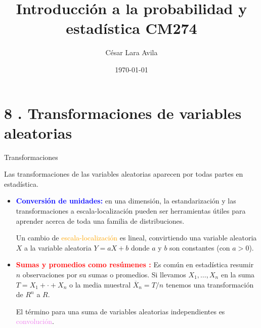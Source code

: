 \documentclass[10pt]{beamer}
\title{Introducci\'on a la probabilidad y estad\'istica CM274}
\date{\today}
\author{C\'esar Lara Avila}
\institute{\url{https://github.com/C-Lara}}
\begin{document}
  \maketitle
  \section{8 . Transformaciones de variables aleatorias }
  
\begin{frame}{Transformaciones}
\small {Las transformaciones de las variables aleatorias aparecen por todas partes en  estad\'istica.

\vspace{0.3cm}

\begin{itemize}
\item \textcolor{blue}{\textbf{Conversi\'on de unidades:}} en una dimensi\'on, la estandarizaci\'on y las transformaciones a escala-localizaci\'on   pueden ser herramientas \'utiles para aprender acerca de toda una familia de distribuciones.


Un cambio de \textcolor{orange}{escala-localizaci\'on} es lineal, convirtiendo una variable aleatoria $X$ a la variable aleatoria  $Y = aX + b$ donde $a$ y $b$ son constantes (con $a> 0$). 

\item \textcolor{red}{\textbf{Sumas y promedios como res\'umenes :}} Es com\'un en  estad\'istica resumir $n$ observaciones por su sumas o promedios. Si llevamos  $X_1,\dots , X_n$ en la suma $T = X_1 + \cdot + X_n$ o la media muestral  $\overline{X}_n = T/ n$ tenemos  una transformaci\'on de $R^n$ a $R$.

\vspace{0.2cm}

El t\'ermino para una suma de variables aleatorias independientes es \textcolor{violet}{convoluci\'on}.
\end{itemize}

}

\end{frame}
\end{document}
